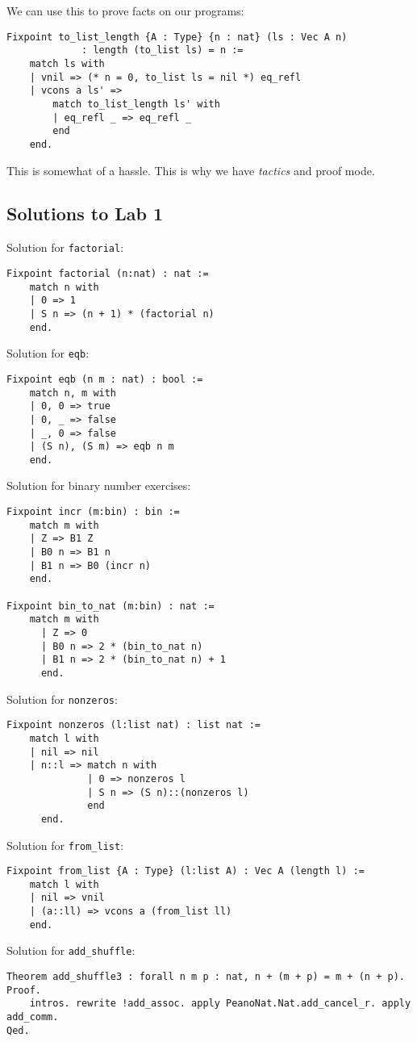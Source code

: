 We can use this to prove facts on our programs:
\begin{lstlisting}
Fixpoint to_list_length {A : Type} {n : nat} (ls : Vec A n)
             : length (to_list ls) = n :=
	match ls with
	| vnil => (* n = 0, to_list ls = nil *) eq_refl
    | vcons a ls' =>
    	match to_list_length ls' with
      	| eq_refl _ => eq_refl _
      	end
    end.
\end{lstlisting}
This is somewhat of a hassle. This is why we have \emph{tactics} and proof mode. 

\subsection{Solutions to Lab 1}
Solution for \lstinline{factorial}:
\begin{lstlisting}
Fixpoint factorial (n:nat) : nat := 
	match n with
	| 0 => 1
	| S n => (n + 1) * (factorial n)
	end.	
\end{lstlisting}

Solution for \lstinline{eqb}:
\begin{lstlisting}
Fixpoint eqb (n m : nat) : bool := 
	match n, m with
	| 0, 0 => true
	| 0, _ => false
	| _, 0 => false
	| (S n), (S m) => eqb n m
	end.
\end{lstlisting}

Solution for binary number exercises:
\begin{lstlisting}
Fixpoint incr (m:bin) : bin := 
	match m with
	| Z => B1 Z
	| B0 n => B1 n
	| B1 n => B0 (incr n) 
	end.

Fixpoint bin_to_nat (m:bin) : nat := 
	match m with
      | Z => 0
      | B0 n => 2 * (bin_to_nat n)
      | B1 n => 2 * (bin_to_nat n) + 1
      end.
\end{lstlisting}

Solution for \lstinline{nonzeros}:
\begin{lstlisting}
Fixpoint nonzeros (l:list nat) : list nat :=
	match l with
	| nil => nil
	| n::l => match n with
			  | 0 => nonzeros l
			  | S n => (S n)::(nonzeros l)
              end
      end.
\end{lstlisting}

Solution for \lstinline{from_list}:
\begin{lstlisting}
Fixpoint from_list {A : Type} (l:list A) : Vec A (length l) := 
	match l with
	| nil => vnil
	| (a::ll) => vcons a (from_list ll)
	end.
\end{lstlisting}

Solution for \lstinline{add_shuffle}:
\begin{lstlisting}
Theorem add_shuffle3 : forall n m p : nat, n + (m + p) = m + (n + p). Proof. 
	intros. rewrite !add_assoc. apply PeanoNat.Nat.add_cancel_r. apply add_comm. 
Qed.
\end{lstlisting}

